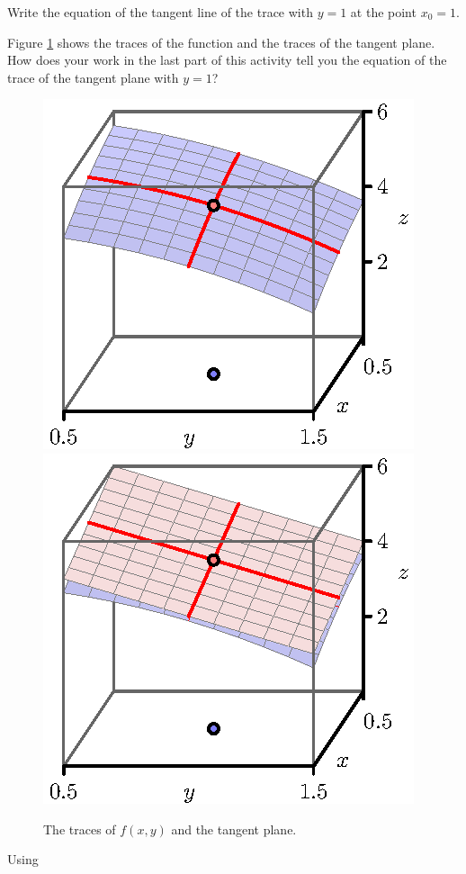 \begin{pa}
\item Write the equation of the tangent line of the trace with $y=1$
  at the point $x_0=1$.  

\item Figure \ref{F:10.4.tangent.traces} shows the traces of the
  function and the traces of the tangent plane.  How does your work in
  the last part of this activity tell you the equation of the trace of
  the tangent plane with $y=1$?

  \begin{figure}[ht]
    \begin{center}
      \includegraphics{figures/fig_10_4_tangent_5.eps}
      \hspace*{20pt}
      \includegraphics{figures/fig_10_4_tangent_6.eps}
    \end{center}
    \caption{The traces of $f(x,y)$ and the tangent plane.}
    \label{F:10.4.tangent.traces}
  \end{figure}

\item Using 





  \ea



\end{pa} \afterpa 